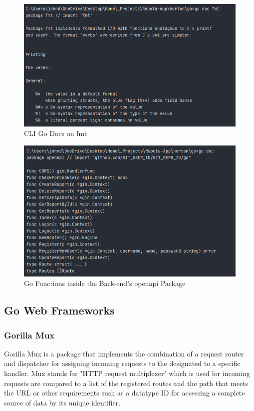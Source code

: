 \begin{figure}[H]
    \caption{CLI Go Docs on fmt}
    \label{image:goDocFmt}
    \centering
    \includegraphics[width=1.0\textwidth]{images/misc/go-doc-fmt.png}
\end{figure}

\begin{figure}[H]
    \caption{Go Functions inside the Back-end's openapi Package}
    \label{image:goFuncs}
    \centering
    \includegraphics[width=1.0\textwidth]{images/misc/godoc-funcs.png}
\end{figure}

\subsection{Go Web Frameworks}
\subsubsection{Gorilla Mux}
Gorilla Mux is a package that implements the combination of a request router and dispatcher for assigning incoming requests to the designated to a specific handler. Mux stands for "HTTP request multiplexer" which is used for incoming requests are compared to a list of the registered routes and the path that meets the URL or other requirements such as a datatype ID for accessing a complete source of data by its unique identifier. \cite{ref8} 

